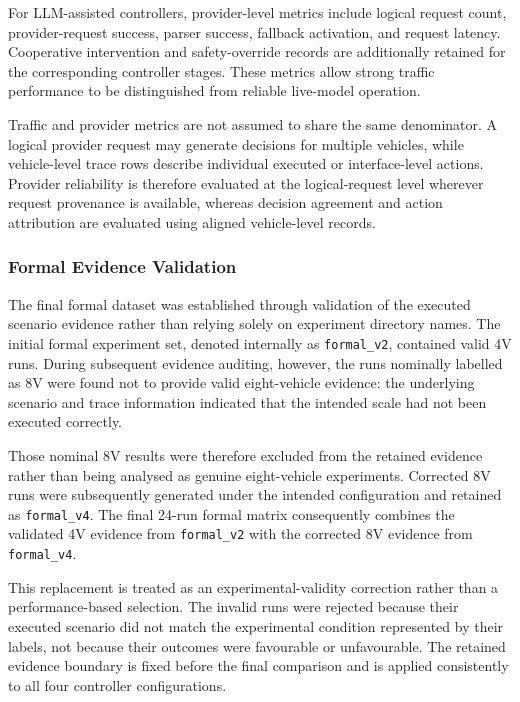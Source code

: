 \documentclass[letterpaper,10pt,conference]{ieeeconf}
\begin{document}
For LLM-assisted controllers, provider-level metrics include logical request count, provider-request success, parser success, fallback activation, and request latency. Cooperative intervention and safety-override records are additionally retained for the corresponding controller stages. These metrics allow strong traffic performance to be distinguished from reliable live-model operation.



Traffic and provider metrics are not assumed to share the same denominator. A logical provider request may generate decisions for multiple vehicles, while vehicle-level trace rows describe individual executed or interface-level actions. Provider reliability is therefore evaluated at the logical-request level wherever request provenance is available, whereas decision agreement and action attribution are evaluated using aligned vehicle-level records.



\subsubsection{Formal Evidence Validation}



The final formal dataset was established through validation of the executed scenario evidence rather than relying solely on experiment directory names. The initial formal experiment set, denoted internally as \texttt{formal\_v2}, contained valid 4V runs. During subsequent evidence auditing, however, the runs nominally labelled as 8V were found not to provide valid eight-vehicle evidence: the underlying scenario and trace information indicated that the intended scale had not been executed correctly.



Those nominal 8V results were therefore excluded from the retained evidence rather than being analysed as genuine eight-vehicle experiments. Corrected 8V runs were subsequently generated under the intended configuration and retained as \texttt{formal\_v4}. The final 24-run formal matrix consequently combines the validated 4V evidence from \texttt{formal\_v2} with the corrected 8V evidence from \texttt{formal\_v4}.



This replacement is treated as an experimental-validity correction rather than a performance-based selection. The invalid runs were rejected because their executed scenario did not match the experimental condition represented by their labels, not because their outcomes were favourable or unfavourable. The retained evidence boundary is fixed before the final comparison and is applied consistently to all four controller configurations.
\end{document}
